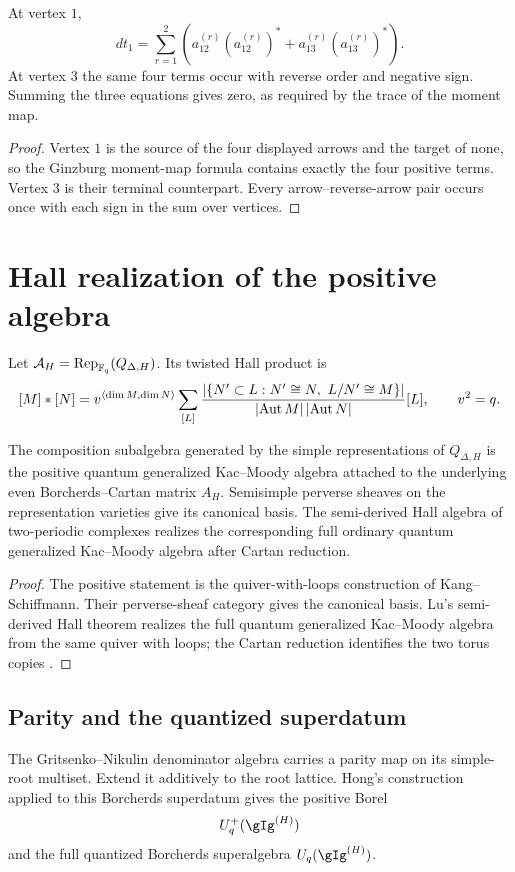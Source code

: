 \begin{calculation}
At vertex $1$,
\[
 d t_1=
 \sum_{r=1}^2
 \left(
 a_{12}^{(r)}(a_{12}^{(r)})^*
 +a_{13}^{(r)}(a_{13}^{(r)})^*
 \right).
\]
At vertex $3$ the same four terms occur with reverse order and negative sign.  Summing the three equations gives zero, as required by the trace of the moment map.
\end{calculation}
\begin{proof}
Vertex $1$ is the source of the four displayed arrows and the target of none, so the Ginzburg moment-map formula contains exactly the four positive terms.  Vertex $3$ is their terminal counterpart.  Every arrow--reverse-arrow pair occurs once with each sign in the sum over vertices.
\end{proof}


\chapter{Hall realization of the positive algebra}
Let $\mathcal A_H=\operatorname{Rep}_{\mathbb F_q}(Q_{\Delta,H})$.  Its twisted Hall product is
\[
 [M]*[N]
 =v^{\langle \dim M,\dim N\rangle}
 \sum_{[L]}
 \frac{\left|\left\{N'\subset L:N'\cong N,\ L/N'\cong M\right\}\right|}
      {\left|\operatorname{Aut} M\right|\left|\operatorname{Aut} N\right|}
 [L],
 \qquad v^2=q.
\]

\begin{theorem}
The composition subalgebra generated by the simple representations of $Q_{\Delta,H}$ is the positive quantum generalized Kac--Moody algebra attached to the underlying even Borcherds--Cartan matrix $A_H$.  Semisimple perverse sheaves on the representation varieties give its canonical basis.  The semi-derived Hall algebra of two-periodic complexes realizes the corresponding full ordinary quantum generalized Kac--Moody algebra after Cartan reduction.
\end{theorem}
\begin{proof}
The positive statement is the quiver-with-loops construction of Kang--Schiffmann.  Their perverse-sheaf category gives the canonical basis.  Lu's semi-derived Hall theorem realizes the full quantum generalized Kac--Moody algebra from the same quiver with loops; the Cartan reduction identifies the two torus copies \cite{KangSchiffmann,LuBorcherdsHall,AxtellLee}.
\end{proof}

\section{Parity and the quantized superdatum}
The Gritsenko--Nikulin denominator algebra carries a parity map on its simple-root multiset.  Extend it additively to the root lattice.  Hong's construction applied to this Borcherds superdatum gives the positive Borel
\[
 U_q^+(\gIg^{(H)})
\]
and the full quantized Borcherds superalgebra $U_q(\gIg^{(H)})$.

